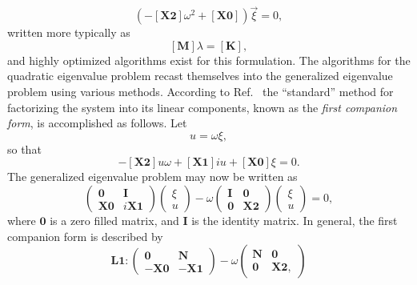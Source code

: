 \begin{equation}
\left(-\mathbf{[X2]}\omega^2+\mathbf{[X0]}\right)\vec\xi=0,
\end{equation}
written more typically as
\begin{equation}
\mathbf{[M]}\lambda=\mathbf{[K]},
\end{equation}
and highly optimized algorithms exist for this formulation. The algorithms for the quadratic eigenvalue problem recast themselves into the generalized eigenvalue problem using various methods. According to Ref.~\cite{Tisseur01thequadratic} the ``standard'' method for factorizing the system into its linear components, known as the \emph{first companion form}, is accomplished as follows. Let
\begin{equation}
u=\omega\xi,
\end{equation}
so that
\begin{equation}
-\mathbf{[X2]}u\omega+\mathbf{[X1]}iu+\mathbf{[X0]}\xi=0.
\end{equation}
The generalized eigenvalue problem may now be written as
\begin{equation}
\begin{pmatrix}
\mathbf{0} & \mathbf{I}\\
\mathbf{X0} & i\mathbf{X1}
\end{pmatrix}
\begin{pmatrix}
\xi \\
u
\end{pmatrix}
-\omega
\begin{pmatrix}
\mathbf{I} & \mathbf{0}\\
\mathbf{0} & \mathbf{X2}
\end{pmatrix}
\begin{pmatrix}
\xi \\
u
\end{pmatrix}
=0,
\end{equation}
where $\mathbf{0}$ is a zero filled matrix, and $\mathbf{I}$ is the identity matrix. In general, the first companion form is described by
\begin{equation}
\mathbf{L1:}
\begin{pmatrix}
\mathbf{0} & \mathbf{N}\\
\mathbf{-X0} & \mathbf{-X1}
\end{pmatrix}-\omega
\begin{pmatrix}
\mathbf{N} & \mathbf{0} \\
\mathbf{0} & \mathbf{X2},
\end{pmatrix}
\end{equation}
